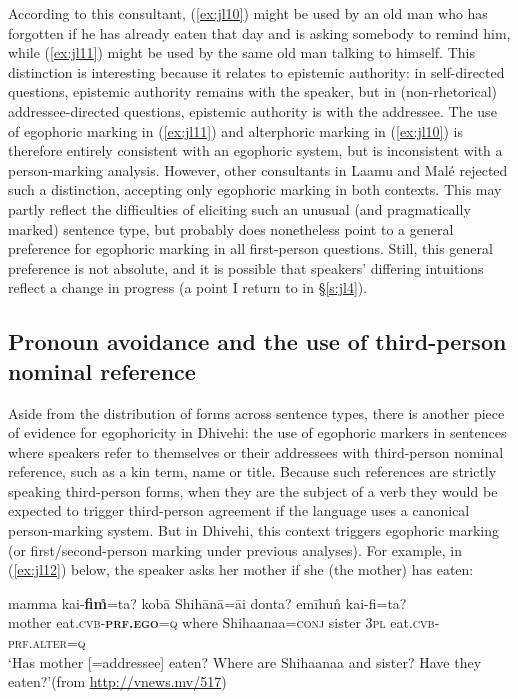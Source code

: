 \documentclass[output=paper]{langsci/langscibook}
\begin{document}
According to this consultant, (\ref{ex:jl10}) might be used by an old man who has forgotten if he has already eaten that day and is asking somebody to remind him, while (\ref{ex:jl11}) might be used by the same old man talking to himself. This distinction is interesting because it relates to epistemic authority: in self-directed questions, epistemic authority remains with the speaker, but in (non-rhetorical) addressee-directed questions, epistemic authority is with the addressee. The use of egophoric marking in (\ref{ex:jl11}) and alterphoric marking in (\ref{ex:jl10}) is therefore entirely consistent with an egophoric system, but is inconsistent with a person-marking analysis. However, other consultants in Laamu and Malé rejected such a distinction, accepting only egophoric marking in both contexts. This may partly reflect the difficulties of eliciting such an unusual (and pragmatically marked) sentence type, but probably does nonetheless point to a general preference for egophoric marking in all first-person questions. Still, this general preference is not absolute, and it is possible that speakers’ differing intuitions reflect a change in progress (a point I return to in §\ref{s:jl4}).

\subsection{Pronoun avoidance and the use of third-person nominal reference}\label{s:jl3-2}

Aside from the distribution of forms across sentence types, there is another piece of evidence for egophoricity in Dhivehi: the use of egophoric markers in sentences where speakers refer to themselves or their addressees with third-person nominal reference, such as a kin term, name or title. Because such references are strictly speaking third-person forms, when they are the subject of a verb they would be expected to trigger third-person agreement if the language uses a canonical person-marking system. But in Dhivehi, this context triggers egophoric marking (or first/second-person marking under previous analyses). For example, in (\ref{ex:jl12}) below, the speaker asks her mother if she (the mother) has eaten:

\begin{exe}
	\ex 	\label{ex:jl12}
	\gll mamma kai-\textbf{fim̊}=ta? kobā Shihānā=āi donta? emīhun̊ kai-fi=ta?\\
	mother eat.\textsc{cvb}-\textbf{\textsc{prf}.\textsc{ego}}=\textsc{q} where Shihaanaa=\textsc{conj} sister 3\textsc{pl} eat.\textsc{cvb}-\textsc{prf}.\textsc{alter}=\textsc{q}\\
	\trans ‘Has mother [=addressee] eaten? Where are Shihaanaa and sister? Have they eaten?’(from \url{http://vnews.mv/517})
\end{exe}
\end{document}
